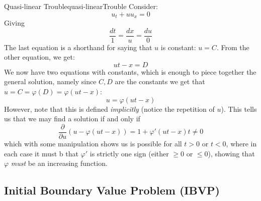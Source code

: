 \documentclass{book}
\renewcommand{\phi}{\varphi}
\begin{document}
\begin{example}{Quasi-linear Trouble}{quasi-linearTrouble}
	Consider:
	\[
		u_t + uu_x = 0
	\]
	Giving
	\[
		\frac{dt}{1} = \frac{dx}{u} = \frac{du}{0}
	\]
	The last equation is a shorthand for saying that $u$ is constant: $u = C$. From the other equation, we
	get:
	\begin{equation}\label{eq:quasiLinTrouble1}
		ut - x = D
	\end{equation}
	We now have two equations with constants, which is enough to piece together the general solution, namely
	since $C,D$ are the constants we get that $u = C = \phi(D) = \phi(ut-x)$:
	\[
		u = \phi(ut - x)
	\]
	However, note that this is defined \emph{implicitly} (notice the repetition of $u$). This tells us that we
	may find a solution if and only if
	\[
		\frac{\partial }{\partial u}(u - \phi(ut-x)) = 1 + \phi'(ut-x)t \ne 0
	\]
	which with some manipulation shows us is possible for all $t > 0$ or $t<0$, where in each case it must
	b that $\phi'$ is strictly one sign (either $\ge 0$ or $\le 0$), showing that $\phi$ \emph{must} be an
	increasing function.


\end{example}


\subsection*{Initial Boundary Value Problem (IBVP)}
\end{document}
